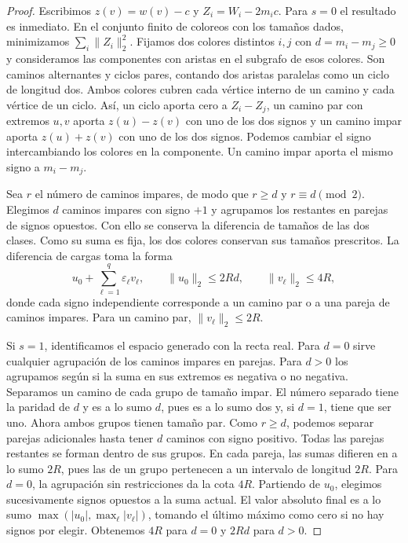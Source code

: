 \documentclass[11pt]{article}
\begin{document}
\begin{proof}
Escribimos \(z(v)=w(v)-c\) y \(Z_i=W_i-2m_i c\). Para \(s=0\) el resultado es inmediato. En el conjunto finito de coloreos con los tamaños dados, minimizamos \(\sum_i\|Z_i\|_2^2\). Fijamos dos colores distintos \(i,j\) con \(d=m_i-m_j\ge0\) y consideramos las componentes con aristas en el subgrafo de esos colores. Son caminos alternantes y ciclos pares, contando dos aristas paralelas como un ciclo de longitud dos. Ambos colores cubren cada vértice interno de un camino y cada vértice de un ciclo. Así, un ciclo aporta cero a \(Z_i-Z_j\), un camino par con extremos \(u,v\) aporta \(z(u)-z(v)\) con uno de los dos signos y un camino impar aporta \(z(u)+z(v)\) con uno de los dos signos. Podemos cambiar el signo intercambiando los colores en la componente. Un camino impar aporta el mismo signo a \(m_i-m_j\).

Sea \(r\) el número de caminos impares, de modo que \(r\ge d\) y \(r\equiv d\pmod 2\). Elegimos \(d\) caminos impares con signo \(+1\) y agrupamos los restantes en parejas de signos opuestos. Con ello se conserva la diferencia de tamaños de las dos clases. Como su suma es fija, los dos colores conservan sus tamaños prescritos. La diferencia de cargas toma la forma
\[
  u_0+\sum_{\ell=1}^q \varepsilon_\ell v_\ell,\qquad
  \|u_0\|_2\le 2Rd,\qquad \|v_\ell\|_2\le4R,
\]
donde cada signo independiente corresponde a un camino par o a una pareja de caminos impares. Para un camino par, \(\|v_\ell\|_2\le2R\).

Si \(s=1\), identificamos el espacio generado con la recta real. Para \(d=0\) sirve cualquier agrupación de los caminos impares en parejas. Para \(d>0\) los agrupamos según si la suma en sus extremos es negativa o no negativa. Separamos un camino de cada grupo de tamaño impar. El número separado tiene la paridad de \(d\) y es a lo sumo \(d\), pues es a lo sumo dos y, si \(d=1\), tiene que ser uno. Ahora ambos grupos tienen tamaño par. Como \(r\ge d\), podemos separar parejas adicionales hasta tener \(d\) caminos con signo positivo. Todas las parejas restantes se forman dentro de sus grupos. En cada pareja, las sumas difieren en a lo sumo \(2R\), pues las de un grupo pertenecen a un intervalo de longitud \(2R\). Para \(d=0\), la agrupación sin restricciones da la cota \(4R\). Partiendo de \(u_0\), elegimos sucesivamente signos opuestos a la suma actual. El valor absoluto final es a lo sumo \(\max(|u_0|,\max_\ell |v_\ell|)\), tomando el último máximo como cero si no hay signos por elegir. Obtenemos \(4R\) para \(d=0\) y \(2Rd\) para \(d>0\).


\end{proof}
\end{document}
